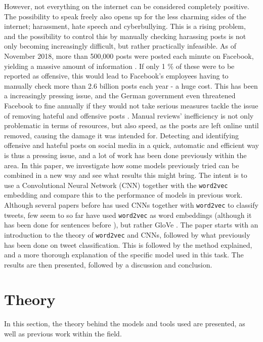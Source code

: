 \documentclass[twocolumn]{article}
\begin{document}
However, not everything on the internet can be considered completely positive. The possibility to speak freely also opens up for the less charming sides of the internet; harassment, hate speech and cyberbullying. This is a rising problem, and the possibility to control this by manually checking harassing posts is not only becoming increasingly difficult, but rather practically infeasible. As of November 2018, more than 500,000 posts were posted each minute on Facebook, yielding a massive amount of information \cite{zeph}. If only 1 \% of these were to be reported as offensive, this would lead to Facebook's employees having to manually check more than 2.6 billion posts each year - a huge cost. This has been a increasingly pressing issue, and the German government even threatened Facebook to fine  annually if they would not take serious measures tackle the issue of removing hateful and offensive posts \cite{EThomasson}. Manual reviews' inefficiency is not only problematic in terms of resources, but also speed, as the posts are left online until removed, causing the damage it was intended for. Detecting and identifying offensive and hateful posts on social media in a quick, automatic and efficient way is thus a pressing issue, and a lot of work has been done previously within the area. In this paper, we investigate how some models previously tried can be combined in a new way and see what results this might bring. The intent is to use a Convolutional Neural Network (CNN) together with the \verb|word2vec| embedding and compare this to the performance of models in previous work. Although several papers before has used CNNs together with \verb|word2vec| to classify tweets, few seem to so far have used \verb|word2vec| as word embeddings (although it has been done for sentences before \cite{KimYoon}), but rather GloVe \cite{2018HateSD, DLNN, Gambck2017}. The paper starts with an introduction to the theory of \verb|word2vec| and CNNs, followed by what previously has been done on tweet classification. This is followed by the method explained, and a more thorough explanation of the specific model used in this task. The results are then presented, followed by a discussion and conclusion. 

\section{Theory}

In this section, the theory behind the models and tools used are presented, as well as previous work within the field. 
\end{document}
